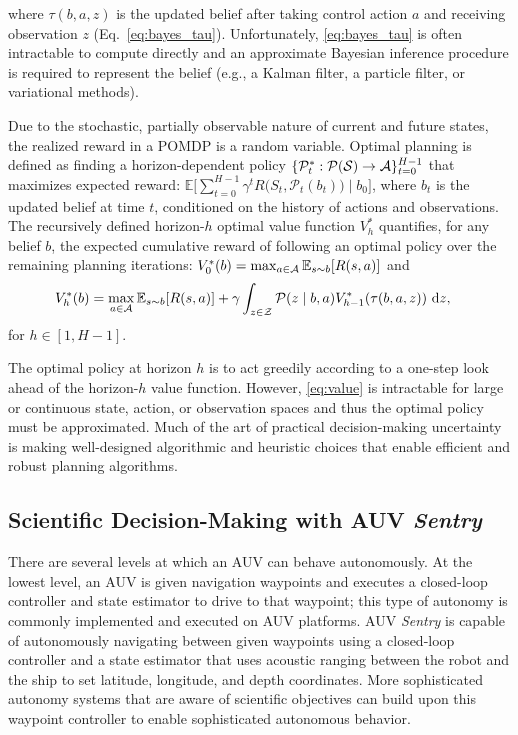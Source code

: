 \noindent where $\tau(b,a,z)$ is the updated belief after taking control action $a$ and receiving observation $z$ (Eq.~\ref{eq:bayes_tau}). Unfortunately, \cref{eq:bayes_tau} is often intractable to compute directly and an approximate Bayesian inference procedure is required to represent the belief (e.g., a Kalman filter\autocite{welch1995introduction}, a particle filter\autocite{Silver2010}, or variational methods\autocite{wainwright2002environmental,kucukelbir2017automatic}). 

Due to the stochastic, partially observable nature of current and future states, the realized reward in a POMDP is a random variable. Optimal planning is defined as finding a horizon-dependent policy $\{\mathcal{P}_t^*: \mathcal{P}(\mathcal{S}) \to \mathcal{A}\}_{t=0}^{H-1}$ that maximizes expected reward: $\mathbb{E} \Big[ \sum_{t=0}^{H-1} \gamma^t R\big(S_t, \mathcal{P}_t(b_t)\big) \mid b_0 \Big]$, where $b_t$ is the updated belief at time $t$, conditioned on the history of actions and observations. The recursively defined horizon-$h$ optimal value function $V^*_h$ quantifies, for any belief $b$, the expected cumulative reward of following an optimal policy over the remaining planning iterations: $V_0^{*}(b) = \operatorname*{max}_{a \in \mathcal{A}} \mathbb{E}_{s \sim b}[R(s, a)]$ and
\begin{align}
    &V_h^{*}(b) =  \max_{a \in \mathcal{A}} \mathbb{E}_{s \sim b}[R(s, a)] + \gamma \int_{z \in \mathcal{Z}} \mathcal{P}(z \mid b, a) V_{h-1}^*(\tau(b, a,z)) \ \text{d}z,
    \label{eq:value}
\end{align}
\noindent for $h \in [1, H-1]$.

The optimal policy at horizon $h$ is to act greedily according to a one-step look ahead of the horizon-$h$ value function. However, \cref{eq:value} is intractable for large or continuous state, action, or observation spaces and thus the optimal policy must be approximated. Much of the art of practical decision-making uncertainty is making well-designed algorithmic and heuristic choices that enable efficient and robust planning algorithms. %



\subsection{Scientific Decision-Making with AUV \emph{Sentry}}
There are several levels at which an AUV can behave autonomously. At the lowest level, an AUV is given navigation waypoints and executes a closed-loop controller and state estimator to drive to that waypoint; this type of autonomy is commonly implemented and executed on AUV platforms. AUV \emph{Sentry} is capable of autonomously navigating between given waypoints using a closed-loop controller and a state estimator that uses acoustic ranging between the robot and the ship to set latitude, longitude, and depth coordinates. More sophisticated autonomy systems that are aware of scientific objectives can build upon this waypoint controller to enable sophisticated autonomous behavior. 

